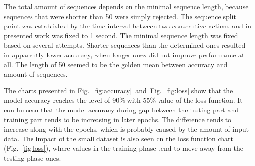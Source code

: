 The total amount of sequences depends on the minimal sequence length, because sequences that were shorter than 50 were simply rejected.
The sequence split point was established by the time interval between two consecutive actions and in presented work was fixed to 1 second.
The minimal sequence length was fixed based on several attempts.
Shorter sequences than the determined ones resulted in apparently lower accuracy, when longer ones did not improve performance at all.
The length of 50 seemed to be the golden mean between accuracy and amount of sequences.

The charts presented in \mbox{Fig.~\ref{fig:accuracy} and Fig.~\ref{fig:loss}} show that the model accuracy reaches the level of 90\% with 55\% value of the loss function.
It can be seen that the model accuracy during gap between the testing part and training part tends to be increasing in later epochs.
The difference tends to increase along with the epochs, which is probably caused by the amount of input data.
The impact of the small dataset is also seen on the loss function chart \mbox{(Fig.~\ref{fig:loss})}, where values in the training phase tend to move away from the testing phase ones.

